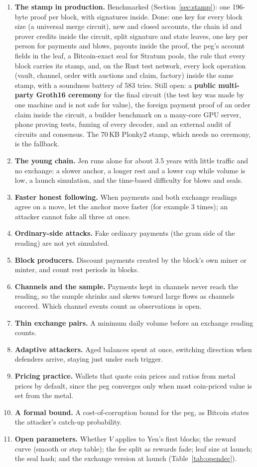 \begin{enumerate}
\item \textbf{The stamp in production.} Benchmarked (Section~\ref{sec:stamp}): one 196-byte proof per block, with signatures inside. Done: one key for every block size (a universal merge circuit), new and closed accounts, the chain id and prover credits inside the circuit, split signature and state leaves, one key per person for payments and blows, payouts inside the proof, the peg's account fields in the leaf, a Bitcoin-exact seal for Stratum pools, the rule that every block carries its stamp, and, on the Rust test network, every lock operation (vault, channel, order with auctions and claim, factory) inside the same stamp, with a soundness battery of 583 tries. Still open: a \textbf{public multi-party Groth16 ceremony} for the final circuit (the test key was made by one machine and is not safe for value), the foreign payment proof of an order claim inside the circuit, a builder benchmark on a many-core GPU server, phone proving tests, fuzzing of every decoder, and an external audit of circuits and consensus. The 70\,KB Plonky2 stamp, which needs no ceremony, is the fallback.
\item \textbf{The young chain.} Jen runs alone for about 3.5 years with little traffic and no exchange: a slower anchor, a longer rest and a lower cap while volume is low, a launch simulation, and the time-based difficulty for blows and seals.
\item \textbf{Faster honest following.} When payments and both exchange readings agree on a move, let the anchor move faster (for example 3 times); an attacker cannot fake all three at once.
\item \textbf{Ordinary-side attacks.} Fake ordinary payments (the gram side of the reading) are not yet simulated.
\item \textbf{Block producers.} Discount payments created by the block's own miner or minter, and count rest periods in blocks.
\item \textbf{Channels and the sample.} Payments kept in channels never reach the reading, so the sample shrinks and skews toward large flows as channels succeed. Which channel events count as observations is open.
\item \textbf{Thin exchange pairs.} A minimum daily volume before an exchange reading counts.
\item \textbf{Adaptive attackers.} Aged balances spent at once, switching direction when defenders arrive, staying just under each trigger.
\item \textbf{Pricing practice.} Wallets that quote coin prices and ratios from metal prices by default, since the peg converges only when most coin-priced value is set from the metal.
\item \textbf{A formal bound.} A cost-of-corruption bound for the peg, as Bitcoin states the attacker's catch-up probability.
\item \textbf{Open parameters.} Whether $V$ applies to Yen's first blocks; the reward curve (smooth or step table); the fee split as rewards fade; leaf size at launch; the seal hash; and the exchange version at launch (Table~\ref{tab:opendec}).
\end{enumerate}

